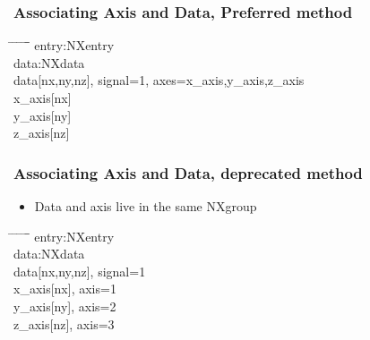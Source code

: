 \documentclass{beamer}
\begin{document}
\begin{frame} \frametitle{Associating Axis and Data, Preferred method}
\begin{tabbing}
\hspace*{1cm} \= \hspace*{1cm} \= \hspace*{1cm} \= \hspace*{1cm} \= \hspace*{1cm} \= \hspace*{1cm}\= \kill
entry:NXentry \\
 \>data:NXdata\\
 \> \> data[nx,ny,nz], signal=1, axes=x\_axis,y\_axis,z\_axis\\
 \> \> x\_axis[nx]\\
 \> \> y\_axis[ny]\\
 \> \> z\_axis[nz]\\
\end{tabbing}
\end{frame}


\begin{frame} \frametitle{Associating Axis and Data, deprecated method}
\begin{itemize}
\item Data and axis live in the same NXgroup
\end{itemize}
\begin{tabbing}
\hspace*{1cm} \= \hspace*{1cm} \= \hspace*{1cm} \= \hspace*{1cm} \= \hspace*{1cm} \= \hspace*{1cm}\= \kill
entry:NXentry \\
 \>data:NXdata\\
 \> \> data[nx,ny,nz], signal=1\\
 \> \> x\_axis[nx], axis=1\\
 \> \> y\_axis[ny], axis=2\\
 \> \> z\_axis[nz], axis=3\\
\end{tabbing}
\end{frame}
\end{document}
